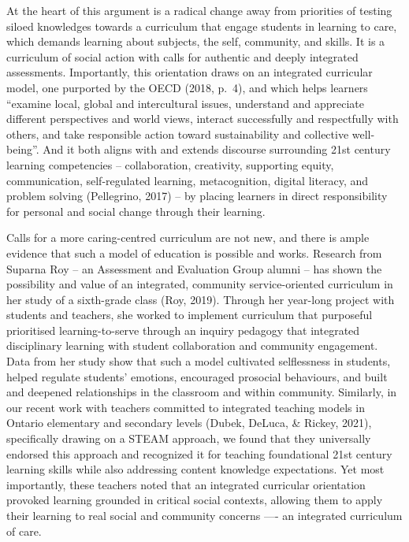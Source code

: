 \documentclass[
]{book}
\begin{document}
At the heart of this argument is a radical change away from priorities of testing siloed knowledges towards a curriculum that engage students in learning to care, which demands learning about subjects, the self, community, and skills. It is a curriculum of social action with calls for authentic and deeply integrated assessments. Importantly, this orientation draws on an integrated curricular model, one purported by the OECD (2018, p.~4), and which helps learners ``examine local, global and intercultural issues, understand and appreciate different perspectives and world views, interact successfully and respectfully with others, and take responsible action toward sustainability and collective well-being''. And it both aligns with and extends discourse surrounding 21st century learning competencies -- collaboration, creativity, supporting equity, communication, self-regulated learning, metacognition, digital literacy, and problem solving (Pellegrino, 2017) -- by placing learners in direct responsibility for personal and social change through their learning.

Calls for a more caring-centred curriculum are not new, and there is ample evidence that such a model of education is possible and works. Research from Suparna Roy -- an Assessment and Evaluation Group alumni -- has shown the possibility and value of an integrated, community service-oriented curriculum in her study of a sixth-grade class (Roy, 2019). Through her year-long project with students and teachers, she worked to implement curriculum that purposeful prioritised learning-to-serve through an inquiry pedagogy that integrated disciplinary learning with student collaboration and community engagement. Data from her study show that such a model cultivated selflessness in students, helped regulate students' emotions, encouraged prosocial behaviours, and built and deepened relationships in the classroom and within community. Similarly, in our recent work with teachers committed to integrated teaching models in Ontario elementary and secondary levels (Dubek, DeLuca, \& Rickey, 2021), specifically drawing on a STEAM approach, we found that they universally endorsed this approach and recognized it for teaching foundational 21st century learning skills while also addressing content knowledge expectations. Yet most importantly, these teachers noted that an integrated curricular orientation provoked learning grounded in critical social contexts, allowing them to apply their learning to real social and community concerns ---- an integrated curriculum of care.
\end{document}

